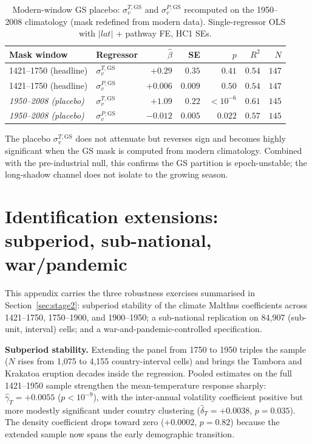 \documentclass[11pt,letterpaper]{article}
\begin{document}
\begin{table}[H]
\centering
\caption{Modern-window GS placebo: $\sigma_v^{T,\mathrm{GS}}$ and $\sigma_v^{P,\mathrm{GS}}$ recomputed on the 1950--2008 climatology (mask redefined from modern data). Single-regressor OLS with $|lat|$ + pathway FE, HC1 SEs.}
\label{tab:gs-modern-placebo}
\small
\begin{tabular}{llrrrrr}
\toprule
Mask window & Regressor & $\hat\beta$ & SE & $p$ & $R^2$ & $N$ \\
\midrule
1421--1750 (headline)       & $\sigma_v^{T,\mathrm{GS}}$ & $+0.29$  & $0.35$ & $0.41$       & $0.54$ & $147$ \\
1421--1750 (headline)       & $\sigma_v^{P,\mathrm{GS}}$ & $+0.006$ & $0.009$ & $0.50$      & $0.54$ & $147$ \\
\textit{1950--2008 (placebo)} & \textit{$\sigma_v^{T,\mathrm{GS}}$} & \textit{$+1.09$}  & \textit{$0.22$} & \textit{$<10^{-6}$} & \textit{$0.61$} & \textit{$145$} \\
\textit{1950--2008 (placebo)} & \textit{$\sigma_v^{P,\mathrm{GS}}$} & \textit{$-0.012$} & \textit{$0.005$} & \textit{$0.022$} & \textit{$0.57$} & \textit{$145$} \\
\bottomrule
\end{tabular}
\par\smallskip\footnotesize{The placebo $\sigma_v^{T,\mathrm{GS}}$ does not attenuate but reverses sign and becomes highly significant when the GS mask is computed from modern climatology. Combined with the pre-industrial null, this confirms the GS partition is epoch-unstable; the long-shadow channel does not isolate to the growing season.}
\end{table}

\section{Identification extensions: subperiod, sub-national, war/pandemic}
\label{app:identification-extensions}

This appendix carries the three robustness exercises summarised in Section~\ref{sec:stage2}: subperiod stability of the climate Malthus coefficients across 1421--1750, 1750--1900, and 1900--1950; a sub-national replication on 84{,}907 (sub-unit, interval) cells; and a war-and-pandemic-controlled specification.

\textbf{Subperiod stability.} Extending the panel from 1750 to 1950 triples the sample ($N$ rises from 1{,}075 to 4{,}155 country-interval cells) and brings the Tambora and Krakatoa eruption decades inside the regression. Pooled estimates on the full 1421--1950 sample strengthen the mean-temperature response sharply: $\hat\gamma_T=+0.0055$ ($p<10^{-9}$), with the inter-annual volatility coefficient positive but more modestly significant under country clustering ($\hat\delta_T=+0.0038$, $p=0.035$). The density coefficient drops toward zero ($+0.0002$, $p=0.82$) because the extended sample now spans the early demographic transition.
\end{document}
